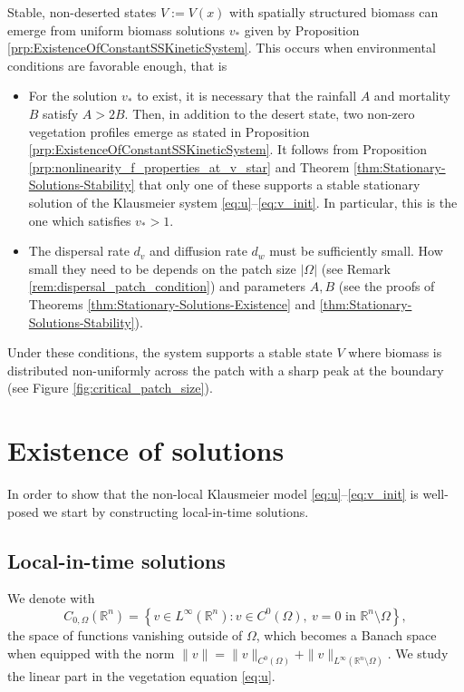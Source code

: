 \documentclass[review,onefignum,onetabnum]{SIAM-styles/siamart171218}
\begin{document}
\begin{main_contrib}
Stable, non-deserted states $V:=V(x)$ with spatially structured biomass can emerge from uniform biomass solutions $v_*$ given by Proposition \ref{prp:ExistenceOfConstantSSKineticSystem}. This occurs when environmental conditions are favorable enough, that is
\begin{itemize}
    \item For the solution $v_*$ to exist, it is necessary that the rainfall $A$ and mortality $B$ satisfy $A > 2B$. Then, in addition to the desert state, two non-zero vegetation profiles emerge as stated in Proposition \ref{prp:ExistenceOfConstantSSKineticSystem}. It follows from Proposition \ref{prp:nonlinearity_f_properties_at_v_star} and Theorem \ref{thm:Stationary-Solutions-Stability} that only one of these supports a stable stationary solution of the Klausmeier system \eqref{eq:u}--\eqref{eq:v_init}. In particular, this is the one which satisfies $v_* > 1$.
    \item The dispersal rate $d_v$ and diffusion rate $d_w$ must be sufficiently small. How small they need to be depends on the patch size $|\Omega|$ (see Remark \ref{rem:dispersal_patch_condition}) and parameters $A, B$ (see the proofs of Theorems \ref{thm:Stationary-Solutions-Existence} and \ref{thm:Stationary-Solutions-Stability}).
\end{itemize}
Under these conditions, the system supports a stable state $V$ where biomass is distributed non-uniformly across the patch with a sharp peak at the boundary (see Figure \ref{fig:critical_patch_size}).
\end{main_contrib}

\section{Existence of solutions}
In order to show that the non-local Klausmeier model \eqref{eq:u}--\eqref{eq:v_init} is well-posed we start by constructing local-in-time solutions. 

\subsection{Local-in-time solutions} 
We denote with 
\begin{equation}
    \label{EQ:C_0_OMEGA}
    C_{0, \Omega}(\mathbb{R}^n) = \left\{ v \in L^\infty(\mathbb{R}^n): v \in C^0(\Omega), \: v = 0 \text{ in } \mathbb{R}^n \setminus \Omega \right\},
\end{equation}
the space of functions vanishing outside of $\Omega$, which becomes a Banach space when equipped with the norm $\|v\|= \|v\|_{C^0(\Omega)} + \|v\|_{L^\infty(\mathbb{R}^n\setminus \Omega)}$. We study the linear part in the vegetation equation \eqref{eq:u}.  
\end{document}
